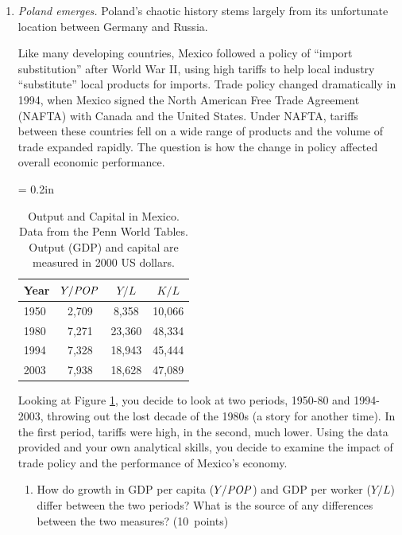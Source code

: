 \documentclass[letterpaper,12pt]{article}
\newcommand{\POP}{\mbox{\em POP\/}}
\begin{document}
\begin{enumerate}
\item {\it Poland emerges.\/} 
Poland's chaotic history stems largely from its unfortunate
location between Germany and Russia.  

Like many developing countries, 
Mexico followed a policy of ``import substitution'' after World War II, 
using high tariffs to help local industry ``substitute'' 
local products for imports.  
Trade policy changed dramatically in 1994,
when Mexico signed the North American Free Trade Agreement (NAFTA)
with Canada and the United States.
Under NAFTA, tariffs between these countries fell on a wide range 
of products and the volume of trade expanded rapidly.  
The question is how the change in policy affected overall 
economic performance.  
 
 \begin{table}
    \centering 
    \tabcolsep = 0.2in
    \begin{tabular}{lccc}
    \hline\hline
    Year    &  $Y/\POP $  &  $Y/L$  &  $K/L$  \\
    \hline\hline
    1950 &  2,709 &  8,358   &  10,066 \\
    1980 &  7,271 &  23,360  &  48,334  \\
    1994 &  7,328 &  18,943  &  45,444 \\
    2003 &  7,938 &  18,628  &  47,089 \\
    \hline\hline
    \end{tabular}
    \caption{Output and Capital in Mexico.
    Data from the Penn World Tables.  Output (GDP) and capital
    are measured in 2000 US dollars.}
    \label{tab:mexico}    
\end{table}

%
Looking at Figure \ref{tab:mexico}, you decide to look at two periods, 
1950-80 and 1994-2003, throwing out the lost decade of the 1980s 
(a story for another time).  
In the first period, tariffs were high, in the second, much lower.  
Using the data provided and your own analytical skills, you decide to 
examine the impact of trade policy and the performance 
of Mexico's economy.  

\begin{enumerate}

\item How do growth in GDP per capita ($Y/\POP$) 
and GDP per worker ($Y/L$) differ between the two periods?  
What is the source of any differences between the two measures?    
(10~points)


\end{enumerate}
\end{enumerate}
\end{document}
